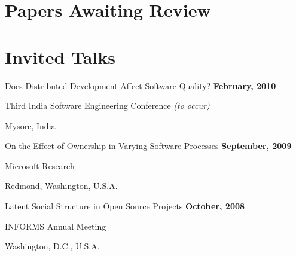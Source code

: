 \documentclass[margin,line,article]{res}
\newenvironment{list1}{
  \begin{list}{}{%
      \setlength{\itemsep}{0in}
      \setlength{\parsep}{0in} \setlength{\parskip}{0in}
      \setlength{\topsep}{0in} \setlength{\partopsep}{0in} 
      \setlength{\leftmargin}{0.17in}}}{\end{list}}
\begin{document}
\begin{resume}











\section{Papers Awaiting Review}








\section{Invited Talks}

Does Distributed Development Affect Software Quality? \hfill \textbf{February, 2010}\\
\vspace{-10pt}
\begin{list1}
\item Third India Software Engineering Conference \emph{(to occur)}
\item Mysore, India
\end{list1}

On the Effect of Ownership in Varying Software Processes \hfill \textbf{September, 2009}\\
\vspace{-10pt}
\begin{list1}
\item Microsoft Research
\item Redmond, Washington, U.S.A.
\end{list1}

Latent Social Structure in Open Source Projects \hfill \textbf{October, 2008}\\
\vspace{-10pt}
\begin{list1}
\item INFORMS Annual Meeting
\item Washington, D.C., U.S.A.
\end{list1}


\end{resume}
\end{document}
